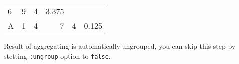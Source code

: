 \documentclass[]{article}
\newenvironment{Shaded}{\begin{snugshade}}{\end{snugshade}}
\newcommand{\KeywordTok}[1]{\textcolor[rgb]{0.13,0.29,0.53}{\textbf{#1}}}
\newcommand{\DecValTok}[1]{\textcolor[rgb]{0.00,0.00,0.81}{#1}}
\newcommand{\StringTok}[1]{\textcolor[rgb]{0.31,0.60,0.02}{#1}}
\newcommand{\VariableTok}[1]{\textcolor[rgb]{0.00,0.00,0.00}{#1}}
\newcommand{\AttributeTok}[1]{\textcolor[rgb]{0.77,0.63,0.00}{#1}}
\newcommand{\NormalTok}[1]{#1}
\begin{document}
\begin{longtable}[]{@{}lrrrrr@{}}
\begin{minipage}[t]{0.14\columnwidth}
6\strut
\end{minipage} & \begin{minipage}[t]{0.14\columnwidth}\raggedleft\strut
9\strut
\end{minipage} & \begin{minipage}[t]{0.18\columnwidth}\raggedleft\strut
4\strut
\end{minipage} & \begin{minipage}[t]{0.19\columnwidth}\raggedleft\strut
3.375\strut
\end{minipage}\tabularnewline
\begin{minipage}[t]{0.05\columnwidth}\raggedright\strut
A\strut
\end{minipage} & \begin{minipage}[t]{0.14\columnwidth}\raggedleft\strut
1\strut
\end{minipage} & \begin{minipage}[t]{0.14\columnwidth}\raggedleft\strut
4\strut
\end{minipage} & \begin{minipage}[t]{0.14\columnwidth}\raggedleft\strut
7\strut
\end{minipage} & \begin{minipage}[t]{0.18\columnwidth}\raggedleft\strut
4\strut
\end{minipage} & \begin{minipage}[t]{0.19\columnwidth}\raggedleft\strut
0.125\strut
\end{minipage}\tabularnewline
\bottomrule
\end{longtable}

Result of aggregating is automatically ungrouped, you can skip this step
by stetting \texttt{:ungroup} option to \texttt{false}.

\begin{Shaded}
\end{Shaded}
\end{document}
